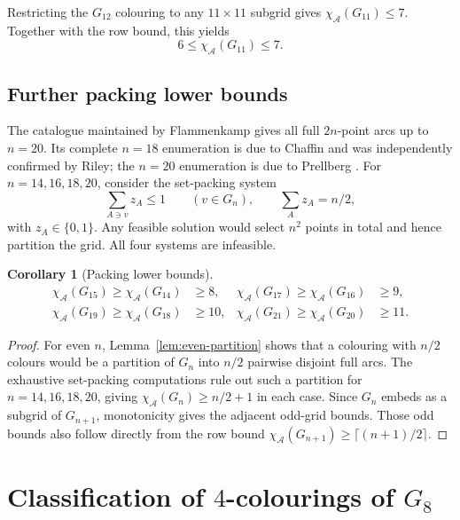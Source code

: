 \documentclass[11pt]{article}
\newtheorem{corollary}[theorem]{Corollary}
\theoremstyle{definition}
\theoremstyle{remark}
\renewcommand{\ge}{\geqslant}
\renewcommand{\le}{\leqslant}
\begin{document}
Restricting the \(G_{12}\) colouring to any \(11\times11\)
subgrid gives
\(\chi_{\mathcal{A}}(G_{11})\le7\).  Together with the row bound, this yields
\begin{equation}\label{eq:eleven}
  6\le \chi_{\mathcal{A}}(G_{11})\le7.
\end{equation}

\subsection{Further packing lower bounds}

The catalogue maintained by Flammenkamp \cite{FlammenkampCatalogue} gives
all full \(2n\)-point arcs up to \(n=20\).  Its complete \(n=18\)
enumeration is due to Chaffin and was independently confirmed by Riley;
the \(n=20\) enumeration is due to Prellberg
\cite{FlammenkampHistory}.
For \(n=14,16,18,20\), consider the set-packing
system
\[
  \sum_{A\ni v} z_A\le1 \qquad (v\in G_n),
  \qquad \sum_A z_A=n/2,
\]
with \(z_A\in\{0,1\}\).  Any feasible solution would select \(n^2\) points
in total and hence partition the grid.  All four systems are infeasible.

\begin{corollary}[Packing lower bounds]\label{cor:further-packing}
\[
\begin{aligned}
\chi_{\mathcal{A}}(G_{15})\ge\chi_{\mathcal{A}}(G_{14})&\ge8, & \chi_{\mathcal{A}}(G_{17})\ge\chi_{\mathcal{A}}(G_{16})&\ge9,\\
\chi_{\mathcal{A}}(G_{19})\ge\chi_{\mathcal{A}}(G_{18})&\ge10, & \chi_{\mathcal{A}}(G_{21})\ge\chi_{\mathcal{A}}(G_{20})&\ge11.
\end{aligned}
\]
\end{corollary}

\begin{proof}
For even \(n\), Lemma~\ref{lem:even-partition} shows that a colouring with
\(n/2\) colours would be a partition of \(G_n\) into \(n/2\) pairwise
disjoint full arcs.  The exhaustive set-packing computations rule out such a
partition for \(n=14,16,18,20\), giving \(\chi_{\mathcal{A}}(G_n)\ge n/2+1\) in each case.
Since \(G_n\) embeds as a subgrid of \(G_{n+1}\), monotonicity gives the
adjacent odd-grid bounds.  Those odd bounds also follow directly from the
row bound \(\chi_{\mathcal{A}}(G_{n+1})\ge\lceil(n+1)/2\rceil\).
\end{proof}

\section{Classification of \texorpdfstring{\(4\)-colourings of \(G_8\)}
  {4-colourings of G8}}
\label{sec:eight-classification}
\end{document}
